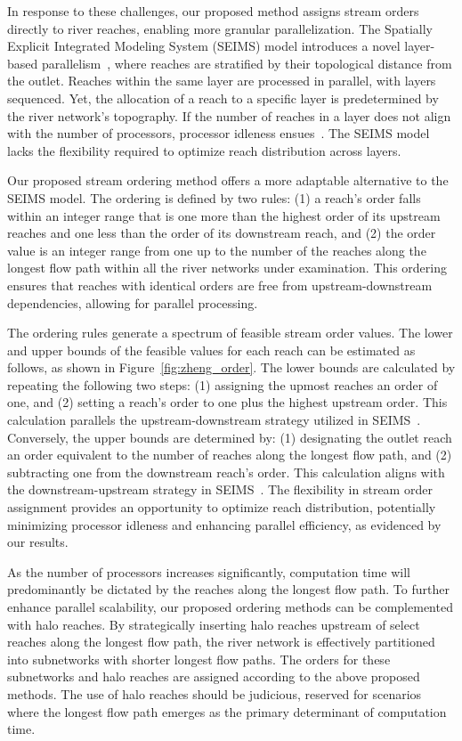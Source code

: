 \documentclass[water,article,submit,pdftex,moreauthors]{Definitions/mdpi}
\begin{document}
In response to these challenges, our proposed method assigns stream orders directly to river reaches, enabling more granular parallelization. The Spatially Explicit Integrated Modeling System (SEIMS) model introduces a novel layer-based parallelism~\cite{liu2014EMS, liu2016EMS, zhu2019EMS}, where reaches are stratified by their topological distance from the outlet. Reaches within the same layer are processed in parallel, with layers sequenced. Yet, the allocation of a reach to a specific layer is predetermined by the river network's topography. If the number of reaches in a layer does not align with the number of processors, processor idleness ensues~\cite{liu2014EMS, zhu2019EMS}. The SEIMS model lacks the flexibility required to optimize reach distribution across layers.

Our proposed stream ordering method offers a more adaptable alternative to the SEIMS model. The ordering is defined by two rules: (1) a reach's order falls within an integer range that is one more than the highest order of its upstream reaches and one less than the order of its downstream reach, and (2) the order value is an integer range from one up to the number of the reaches along the longest flow path within all the river networks under examination. This ordering ensures that reaches with identical orders are free from upstream-downstream dependencies, allowing for parallel processing.

The ordering rules generate a spectrum of feasible stream order values. The lower and upper bounds of the feasible values for each reach can be estimated as follows, as shown in Figure~\ref{fig:zheng_order}. The lower bounds are calculated by repeating the following two steps: (1) assigning the upmost reaches an order of one, and (2) setting a reach's order to one plus the highest upstream order. This calculation parallels the upstream-downstream strategy utilized in SEIMS~\cite[Fig. 6b]{zhu2019EMS}. Conversely, the upper bounds are determined by: (1) designating the outlet reach an order equivalent to the number of reaches along the longest flow path, and (2) subtracting one from the downstream reach's order. This calculation aligns with the downstream-upstream strategy in SEIMS~\cite[Fig. 6c]{zhu2019EMS}. The flexibility in stream order assignment provides an opportunity to optimize reach distribution, potentially minimizing processor idleness and enhancing parallel efficiency, as evidenced by our results.

As the number of processors increases significantly, computation time will predominantly be dictated by the reaches along the longest flow path. To further enhance parallel scalability, our proposed ordering methods can be complemented with halo reaches. By strategically inserting halo reaches upstream of select reaches along the longest flow path, the river network is effectively partitioned into subnetworks with shorter longest flow paths. The orders for these subnetworks and halo reaches are assigned according to the above proposed methods. The use of halo reaches should be judicious, reserved for scenarios where the longest flow path emerges as the primary determinant of computation time.
\end{document}
